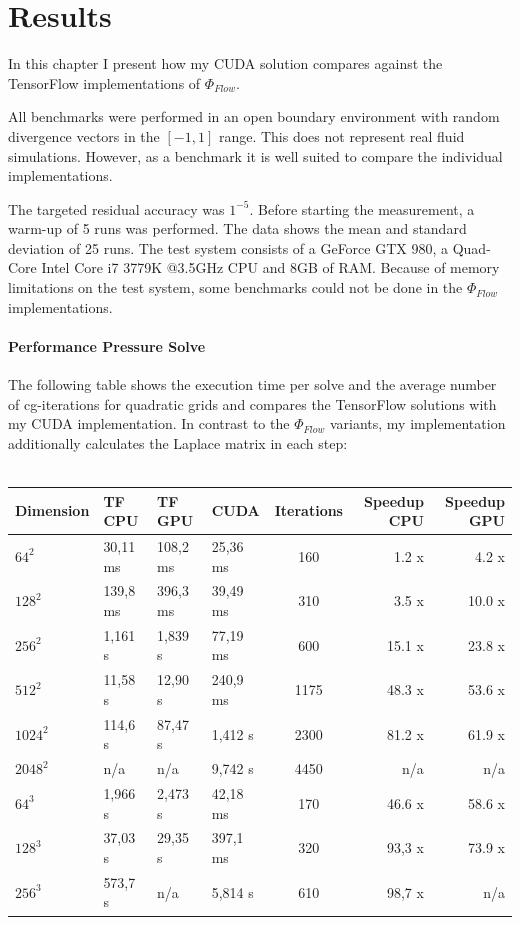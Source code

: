 \chapter{Results}\label{chapter:results}

In this chapter I present how my CUDA solution compares against the TensorFlow implementations of $\Phi_{Flow}$.
\par All benchmarks were performed in an open boundary environment with random divergence vectors in the $\left[-1, 1 \right]$ range. This does not represent real fluid simulations. However, as a benchmark it is well suited to compare the individual implementations. 
\par The targeted residual accuracy was $1^{-5}$. Before starting the measurement, a warm-up of 5 runs was performed. The data shows the mean and standard deviation of 25 runs. The test system consists of a GeForce GTX 980, a Quad-Core Intel Core i7 3779K @3.5GHz CPU and 8GB of RAM. Because of memory limitations on the test system, some benchmarks could not be done in the $\Phi_{Flow}$ implementations.
\subsubsection{Performance Pressure Solve}
The following table shows the execution time per solve and the average number of cg-iterations for quadratic grids and compares the TensorFlow solutions with my CUDA implementation. In contrast to the $\Phi_{Flow}$ variants, my implementation additionally calculates the Laplace matrix in each step: \\\\
\renewcommand{\arraystretch}{1.36}
\small
\begin{tabular}{l||l|l|l||c||r|r}
\hline
Dimension & TF CPU   & TF GPU   & CUDA     & Iterations & Speedup CPU & Speedup GPU \\ \hline
$64^2$   & 30,11 ms & 108,2 ms & 25,36 ms & 160  & 1.2 x  & 4.2 x  \\ \hline
$128^2$  & 139,8 ms & 396,3 ms & 39,49 ms & 310  & 3.5 x  & 10.0 x \\ \hline
$256^2$  & 1,161 s  & 1,839 s  & 77,19 ms & 600  & 15.1 x & 23.8 x \\ \hline
$512^2$  & 11,58 s  & 12,90 s  & 240,9 ms & 1175 & 48.3 x & 53.6 x \\ \hline
$1024^2$ & 114,6 s  & 87,47 s  & 1,412 s  & 2300 & 81.2 x & 61.9 x \\ \hline
$2048^2$ & n/a      & n/a      & 9,742 s  & 4450 & n/a    & n/a    \\ \hline \hline

$64^3$   & 1,966 s  & 2,473 s  & 42,18 ms & 170  & 46.6 x & 58.6 x \\ \hline
$128^3$  & 37,03 s  & 29,35 s  & 397,1 ms & 320  & 93,3 x & 73.9 x \\ \hline
$256^3$  & 573,7 s  & n/a      & 5,814 s  & 610  & 98,7 x & n/a 		  \\ \hline
\end{tabular}
\normalsize

